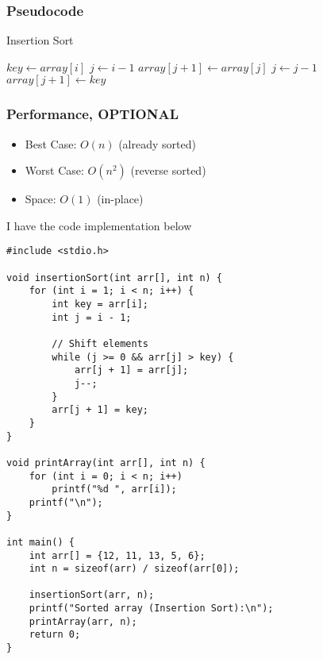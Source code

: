 \documentclass[a4paper,12pt]{article}
\begin{document}
\hrulefill


\subsubsection{Pseudocode}

\begin{algorithm}[H]
\caption{Insertion Sort}
\begin{algorithmic}[1]
        \State $key \gets array[i]$
        \State $j \gets i - 1$
            \State $array[j + 1] \gets array[j]$
            \State $j \gets j - 1$
        \EndWhile
        \State $array[j + 1] \gets key$
    \EndFor
\EndProcedure
\end{algorithmic}
\end{algorithm}

\subsubsection{Performance, OPTIONAL}
\begin{itemize}
    \item Best Case: $O(n)$ (already sorted)
    \item Worst Case: $O(n^2)$ (reverse sorted)
    \item Space: $O(1)$ (in-place)
\end{itemize}

I have the code implementation below

\begin{lstlisting}
#include <stdio.h>

void insertionSort(int arr[], int n) {
    for (int i = 1; i < n; i++) {
        int key = arr[i];
        int j = i - 1;

        // Shift elements
        while (j >= 0 && arr[j] > key) {
            arr[j + 1] = arr[j];
            j--;
        }
        arr[j + 1] = key;
    }
}

void printArray(int arr[], int n) {
    for (int i = 0; i < n; i++)
        printf("%d ", arr[i]);
    printf("\n");
}

int main() {
    int arr[] = {12, 11, 13, 5, 6};
    int n = sizeof(arr) / sizeof(arr[0]);

    insertionSort(arr, n);
    printf("Sorted array (Insertion Sort):\n");
    printArray(arr, n);
    return 0;
}
\end{lstlisting}
\end{document}
